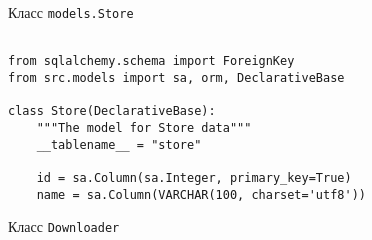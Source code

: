\begin{center}Класс \texttt{models.Store}\end{center}

\begin{lstlisting}[style=app]

from sqlalchemy.schema import ForeignKey
from src.models import sa, orm, DeclarativeBase

class Store(DeclarativeBase):
    """The model for Store data"""
    __tablename__ = "store"

    id = sa.Column(sa.Integer, primary_key=True)
    name = sa.Column(VARCHAR(100, charset='utf8'))

\end{lstlisting}


\begin{center}Класс \texttt{Downloader}\end{center}

